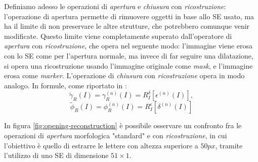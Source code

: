 Definiamo adesso le operazioni di \textit{apertura} e \textit{chiusura} con \textit{ricostruzione}: l'operazione di apertura permette di rimuovere oggetti in base allo SE usato, ma ha il limite di non preservare le altre strutture, che potrebbero comunque venir modificate. Questo limite viene completamente superato dall'operatore di \textit{apertura} con \textit{ricostruzione}, che opera nel seguente modo: l'immagine viene erosa con lo SE come per l'apertura normale, ma invece di far seguire una dilatazione, si opera una ricostruzione usando l'immagine originale come \textit{mask}, e l'immagine erosa come \textit{marker}. L'operazione di \textit{chiusura} con \textit{ricostruzione} opera in modo analogo. In formule, come riportato in \cite{bib:top-hat-paper}:
\begin{equation}
	\label{eq:opening-reconstruction}
	\tilde{\gamma}_{R}(I) = \gamma_{R}^{(n)}(I) = R_{I}^{\delta}[\epsilon^{(n)}(I)],
\end{equation}
\begin{equation}
	\label{eq:closing-reconstruction}
	\tilde{\phi}_{R}(I) = \phi_{R}^{(n)}(I) = R_{I}^{\epsilon}[\delta^{(n)}(I)]
\end{equation}\par
In figura \ref{fig:opening-reconstruction} \`e possibile osservare un confronto fra le operazioni di \textit{apertura} morfologica "standard" e con \textit{ricostruzione}, in cui l'obiettivo \`e quello di estrarre le lettere con altezza superiore a $50px$, tramite l'utilizzo di uno SE di dimensione $51\times1$.
